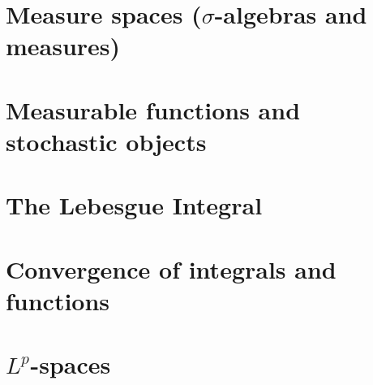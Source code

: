 \documentclass{lecturenotes}
\begin{document}
\chapter{Measure spaces ($\sigma$-algebras and measures)}
\label{chapter:sigma_algebras}


\chapter{Measurable functions and stochastic objects}
\label{chapter:measurable_functions}


\chapter{The Lebesgue Integral}
\label{chapter:integration}


\chapter{Convergence of integrals and functions}
\label{chapter:convergence}


\chapter{$L^p$-spaces}
\label{chapter:lp_spaces}


%
%

%
\end{document}
